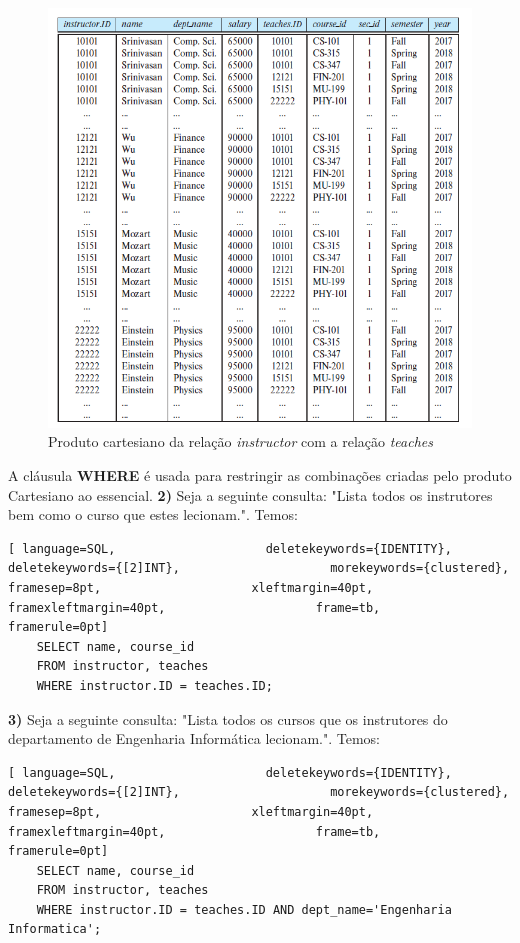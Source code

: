 \documentclass[titlepage]{book}
\theoremstyle{definition}
\begin{document}
\begin{figure}[H]
    \centering
    \includegraphics[scale = 0.4]{cap2/prod_cartesiano.png}
    \caption{Produto cartesiano da relação \textit{instructor} com a relação \textit{teaches}}
\end{figure}

A cláusula \textbf{WHERE} é usada para restringir as combinações criadas pelo produto Cartesiano ao essencial.
\textbf{2)} Seja a seguinte consulta: "Lista todos os instrutores bem como o curso que estes lecionam.". Temos:
\begin{lstlisting}[ language=SQL,                     deletekeywords={IDENTITY},                     deletekeywords={[2]INT},                     morekeywords={clustered},                     framesep=8pt,                     xleftmargin=40pt,                     framexleftmargin=40pt,                     frame=tb,                     framerule=0pt]
    SELECT name, course_id
    FROM instructor, teaches
    WHERE instructor.ID = teaches.ID;
\end{lstlisting}

\textbf{3)} Seja a seguinte consulta: "Lista todos os cursos que os instrutores do departamento de Engenharia Informática lecionam.". Temos:
\begin{lstlisting}[ language=SQL,                     deletekeywords={IDENTITY},                     deletekeywords={[2]INT},                     morekeywords={clustered},                     framesep=8pt,                     xleftmargin=40pt,                     framexleftmargin=40pt,                     frame=tb,                     framerule=0pt]
    SELECT name, course_id
    FROM instructor, teaches
    WHERE instructor.ID = teaches.ID AND dept_name='Engenharia Informatica';
\end{lstlisting}
\end{document}
